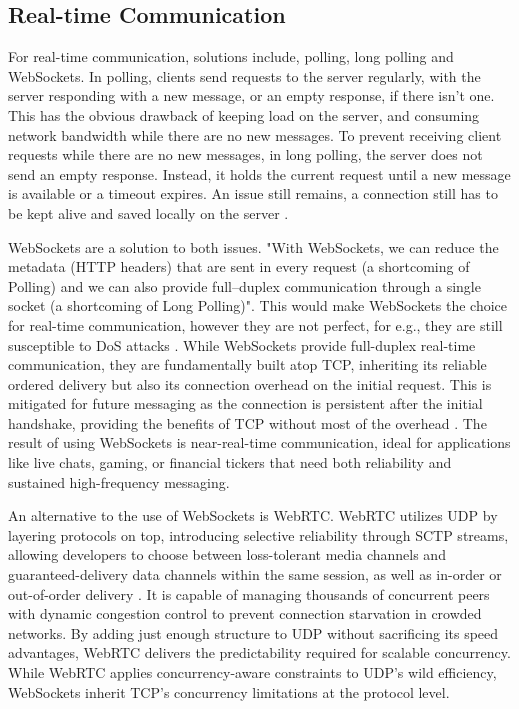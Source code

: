 \documentclass[]{final}
\begin{document}
\subsection{Real-time Communication}

For real-time communication, solutions include, polling, long polling and WebSockets. In polling,
clients send requests to the server regularly, with the server responding with a new message, or
an empty response, if there isn't one. This has the obvious drawback of keeping load on the server,
and consuming network bandwidth while there are no new messages. To prevent receiving client requests
while there are no new messages, in long polling, the server does not send an empty response. Instead,
it holds the current request until a new message is available or a timeout expires. An issue still remains,
a connection still has to be kept alive and saved locally on the server \cite{gupta_overview_2018}.

WebSockets are a solution to both issues. "With WebSockets, we can reduce the metadata (HTTP headers) that are sent in
every request (a shortcoming of Polling) and we can also provide full–duplex communication through a
single socket (a shortcoming of Long Polling)". This would make WebSockets the choice for real-time
communication, however they are not perfect, for e.g., they are still susceptible to DoS attacks
\cite{gupta_overview_2018}. While WebSockets provide full-duplex real-time communication, they are
fundamentally built atop TCP, inheriting its reliable ordered delivery but
also its connection overhead on the initial request. This is mitigated for
future messaging as the connection is persistent after the initial
handshake, providing the benefits of TCP without most of the overhead \cite{gupta_overview_2018}.
The result of using WebSockets is near-real-time communication, ideal for
applications like live chats, gaming, or financial tickers that need both
reliability and sustained high-frequency messaging.

An alternative to the use of WebSockets is WebRTC. WebRTC utilizes UDP by
layering protocols on top, introducing selective reliability through SCTP
streams, allowing developers to choose between loss-tolerant media channels and
guaranteed-delivery data channels within the same session, as well as
in-order or out-of-order delivery \cite{sredojev_webrtc_2015}. It is capable of
managing thousands of concurrent peers with dynamic congestion control to
prevent connection starvation in crowded networks. By
adding just enough structure to UDP without sacrificing its speed advantages,
WebRTC delivers the predictability required for scalable concurrency.
While WebRTC applies concurrency-aware constraints to UDP's wild efficiency,
WebSockets inherit TCP's concurrency limitations at the protocol level.
\end{document}
